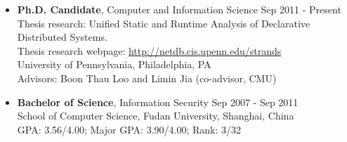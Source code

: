 \begin{itemize}
\item {\bf Ph.D. Candidate},
Computer and Information Science \hfill Sep 2011 - Present\\
Thesis research: Unified Static and Runtime Analysis of Declarative Distributed Systems.\\
Thesis research webpage: \url{http://netdb.cis.upenn.edu/strands}\\
University of Pennsylvania, Philadelphia, PA  \\
Advisors: Boon Thau Loo and Limin Jia (co-advisor, CMU) \\

\item {\bf Bachelor of Science}, Information Security \hfill Sep 2007 - Sep 2011\\
School of Computer Science,
Fudan University, Shanghai, China  \\
GPA: 3.56/4.00; Major GPA: 3.90/4.00; Rank: 3/32
\end{itemize}
